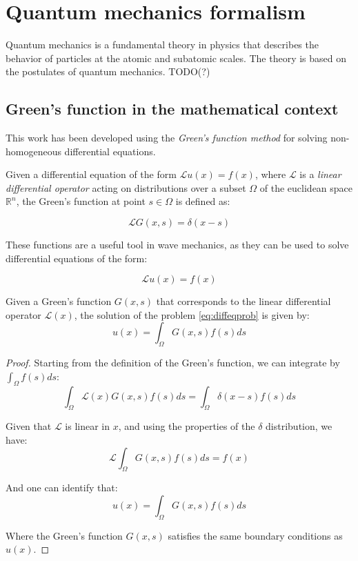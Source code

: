 \appendix
\section{Quantum mechanics formalism}

Quantum mechanics is a fundamental theory in physics that describes the behavior of particles at the atomic and subatomic scales. The theory is based on the postulates of quantum mechanics. TODO(?)

\subsection{Green's function in the mathematical context}

This work has been developed using the \textit{Green's function method} for solving non-homogeneous differential equations. 

Given a differential equation of the form $\mathcal L u(x) = f(x)$, where $\mathcal L$ is a \textit{linear differential operator} acting on distributions over a subset $\Omega$ of the euclidean space $\mathbb R^n$, the Green's function at point $s\in \Omega$ is defined as:

\begin{equation}
    \mathcal L G(x,s)=\delta(x-s)
\end{equation}

These functions are a useful tool in wave mechanics, as they can be used to solve differential equations of the form:

\begin{equation}\label{eq:diffeqprob}
    \mathcal L u(x)=f(x)
\end{equation}

\begin{theorem}
    Given a Green's function $G(x,s)$ that corresponds to the linear differential operator $\mathcal{L}(x)$, the solution of the problem \ref{eq:diffeqprob} is given by:
    \begin{equation}
        u(x)=\int_\Omega G(x,s) f(s) ds
    \end{equation}
\end{theorem}

\begin{proof}
    Starting from the definition of the Green's function, we can integrate by $\int_\Omega f(s)ds$:
    \begin{equation}
        \int_\Omega \mathcal L (x) G(x,s)f(s)ds=\int_\Omega\delta (x-s)f(s)ds
    \end{equation}

    Given that $\mathcal{L}$ is linear in $x$, and using the properties of the $\delta$ distribution, we have:
    \begin{equation}
        \mathcal{L}\int_\Omega G(x,s)f(s)ds=f(x)
    \end{equation}

    And one can identify that:
    \begin{equation}
        u(x)=\int_\Omega G(x,s)f(s)ds
    \end{equation}
    
    Where the Green's function $G(x,s)$ satisfies the same boundary conditions as $u(x)$.
\end{proof}


